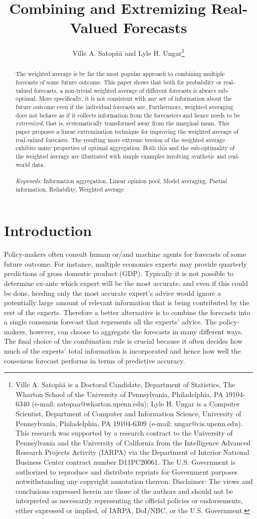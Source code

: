\documentclass[11pt]{article}
\title{Combining and Extremizing Real-Valued Forecasts}
\author{
Ville A. Satop\"a\"a and Lyle H. Ungar\thanks{Ville A. Satop\"a\"a is a Doctoral Candidate, Department of Statistics, The Wharton School of the University of Pennsylvania, Philadelphia, PA 19104-6340 (e-mail: satopaa@wharton.upenn.edu); Lyle H. Ungar is a Computer Scientist, Department of Computer and Information Science, University of Pennsylvania, Philadelphia, PA 19104-6309 (e-mail: ungar@cis.upenn.edu). This research was supported by a research contract to the University
of Pennsylvania and the University of California from the Intelligence
Advanced Research Projects Activity (IARPA) via the Department of
Interior National Business Center contract number D11PC20061. The
U.S. Government is authorized to reproduce and distribute reprints for
Government purposes notwithstanding any copyright annotation
thereon. Disclaimer: The views and conclusions expressed herein are
those of the authors and should not be interpreted as necessarily
representing the official policies or endorsements, either expressed
or implied, of IARPA, DoI/NBC, or the U.S. Government.}}
\date{\vspace{-8.5ex}}
\theoremstyle{definition}
\theoremstyle{definition}
\begin{document}
\maketitle

\begin{abstract}

The weighted average is by far the most popular approach to combining
multiple forecasts of some future outcome. This paper shows that
both for probability or real-valued forecasts, a non-trivial weighted average
of different forecasts is always sub-optimal. More specifically, it is
not consistent with any set of information about the future outcome
even if the individual forecasts are. Furthermore, weighted averaging
does not behave as if it collects information from the forecasters and
hence needs to be \textit{extremized}, that is, 
systematically transformed away from the marginal mean. This paper
proposes a linear extremization technique for improving the weighted
average of real-valued forecasts. The resulting more extreme
version of the weighted average exhibits many properties of optimal
aggregation. Both this and the sub-optimality of the weighted average are illustrated with simple examples involving 
synthetic and real-world data. \\
\\
\textit{Keywords:} Information aggregation, Linear opinion pool, Model averaging, Partial information, Reliability, Weighted average
\end{abstract}


\section{Introduction} \label{introduction}

Policy-makers often consult human or/and machine agents for forecasts
of some future outcome. For instance, multiple economics experts may
provide quarterly predictions of gross domestic product (GDP). Typically it is not possible to determine ex-ante which expert will be the most accurate, and even if this could be done, heeding only the most accurate expert's advice would ignore a potentially large amount of relevant information that is being contributed by the rest of the experts. Therefore a better alternative is to combine the
forecasts into a single consensus forecast that represents all the experts' advice. 
The policy-makers, however, can choose to aggregate the forecasts in many different ways. The final choice of the combination rule is crucial because it often decides how much of the experts' total information is incorporated and hence how well the consensus forecast performs in terms of predictive accuracy.
\end{document}
